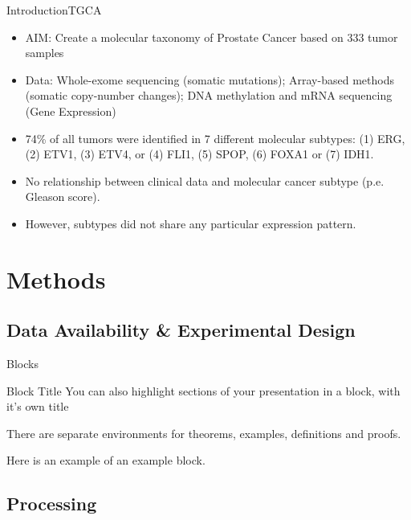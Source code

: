 \documentclass{beamer}
\begin{document}
\begin{frame}{Introduction}{TGCA \cite{Abeshouse2015}}
  \begin{itemize}
  \item<1-> {
    AIM: Create a molecular taxonomy of Prostate Cancer based on 333 tumor samples
    \pause %
  }
  \item<2-> {   
	Data: Whole-exome sequencing (somatic mutations); Array-based methods (somatic copy-number changes); DNA 		methylation and mRNA sequencing (Gene Expression)  
  }
  \item<3-> {
    74\% of all tumors were identified in 7 different molecular subtypes: (1) ERG, (2) ETV1, (3) ETV4, or (4) FLI1, (5) SPOP, (6) FOXA1 or (7) IDH1.
  }
  \item<4-> {
  	No relationship between clinical data and molecular cancer subtype (p.e. Gleason score).
  }
  \item<5->{
  	However, subtypes did not share any particular expression pattern. 
  }
  \end{itemize}
\end{frame}

\section{Methods}

\subsection{Data Availability \& Experimental Design}

\begin{frame}{Blocks}
\begin{block}{Block Title}
You can also highlight sections of your presentation in a block, with it's own title
\end{block}
\begin{theorem}
There are separate environments for theorems, examples, definitions and proofs.
\end{theorem}
\begin{example}
Here is an example of an example block.
\end{example}
\end{frame}

\subsection{Processing}
\end{document}
